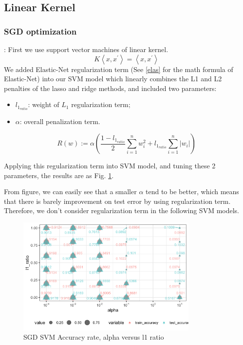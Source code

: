 \documentclass[8pt]{beamer}
\begin{document}
\subsection{Linear Kernel}
\subsubsection{SGD optimization}\label{svmlkgo}
\begin{frame}[allowframebreaks]{\secname : \subsecname}{\subsubsecname}
First we use support vector machines of linear kernel. 
$$
K\left\langle x, x^{\prime}\right\rangle=\left\langle x, x^{\prime}\right\rangle
$$	
We added Elastic-Net regularization term (See \eqref{elas} for the math formula of Elastic-Net) into our SVM model which linearly combines the L1 and L2 penalties of the lasso and ridge methods, and included two parameters:
\begin{itemize}
  \item $l_{1_{ratio}}$: weight of $L_1$ regularization term;
  \item $\alpha$: overall penalization term.
\end{itemize}
\begin{equation}\label{elas}
	R(w) := \alpha(\frac{1-l_{1_{ratio}}}{2} \sum_{i=1}^{n} w_i^2 + l_{1_{ratio}} \sum_{i=1}^{n} |w_i|)
\end{equation}

Applying this regularization term into SVM model, and tuning these 2 parameters, the results are as Fig. \ref{SGD SVM Accuracy rate, alpha versus l1 ratio}. 

\framebreak
From figure, we can easily see that a smaller $\alpha$ tend to be better, which means that there is barely improvement on test error by using regularization term. Therefore, we don't consider regularization term in the following SVM models.  
\begin{figure}[htbp]
\centerline{\includegraphics[width=0.8\textwidth]{figure/SGD SVM Accuracy rate, alpha versus l1_ratio.png}}
\caption{SGD SVM Accuracy rate, alpha versus l1 ratio}
\label{SGD SVM Accuracy rate, alpha versus l1 ratio}
\end{figure}



\end{frame}
\end{document}
